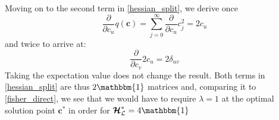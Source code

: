 \documentclass[]{report}
\begin{document}
		Moving on to the second term in \ref{hessian_split}, we derive once
		\begin{equation}\label{gradient_q}
			\frac{\partial}{\partial c_u}q(\mathbf{c}) = \sum_{j=0}^{\infty}\frac{\partial}{\partial c_u}c_j^2 = 2c_u
		\end{equation}
		and twice to arrive at:
		\begin{equation}
			\frac{\partial}{\partial c_v}2c_u = 2\delta_{uv}
		\end{equation}
		Taking the expectation value does not change the result. Both terms in \ref{hessian_split} are thus $2\mathbbm{1}$ matrices and, comparing it to \ref{fisher_direct}, we see that we would have to require $\lambda = 1$ at the optimal solution point $\mathbf{c}^*$ in order for $\bm{\mathcal{H}}^*_\mathcal{L} = 4\mathbbm{1}$
		
\end{document}

